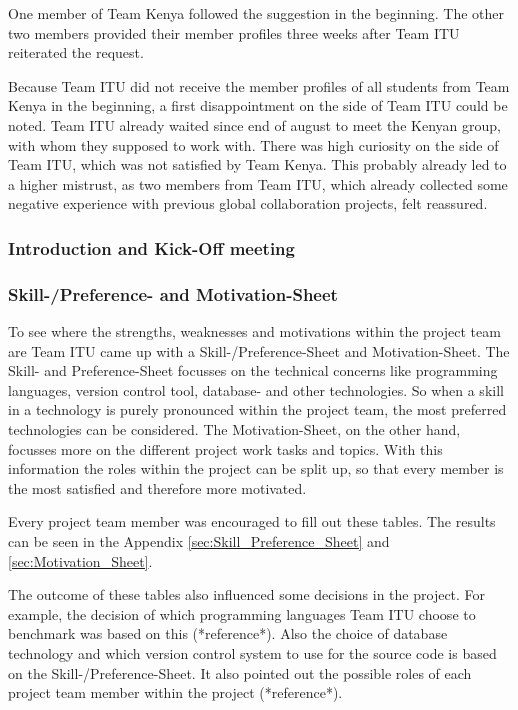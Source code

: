 One member of Team Kenya followed the suggestion in the beginning. The other two members provided their member profiles three weeks after Team ITU reiterated the request.

Because Team ITU did not receive the member profiles of all students from Team Kenya in the beginning, a first disappointment on the side of Team ITU could be noted. Team ITU already waited since end of august to meet the Kenyan group, with whom they supposed to work with. There was high curiosity on the side of Team ITU, which was not satisfied by Team Kenya. This probably already led to a higher mistrust, as two members from Team ITU, which already collected some negative experience with previous global collaboration projects, felt reassured.

\subsubsection {Introduction and Kick-Off meeting}

\subsubsection {Skill-/Preference- and Motivation-Sheet}
To see where the strengths, weaknesses and motivations within the project team are Team ITU came up with a Skill-/Preference-Sheet and Motivation-Sheet. The Skill- and Preference-Sheet focusses on the technical concerns like programming languages, version control tool, database- and other technologies. So when a skill in a technology is purely pronounced within the project team, the most preferred technologies can be considered. The Motivation-Sheet, on the other hand, focusses more on the different project work tasks and topics. With this information the roles within the project can be split up, so that every member is the most satisfied and therefore more motivated.

Every project team member was encouraged to fill out these tables. The results can be seen in the Appendix \ref{sec:Skill_Preference_Sheet} and \ref{sec:Motivation_Sheet}.

The outcome of these tables also influenced some decisions in the project. For example, the decision of which programming languages Team ITU choose to benchmark was based on this (*reference*). Also the choice of database technology and which version control system to use for the source code is based on the Skill-/Preference-Sheet. It also pointed out the possible roles of each project team member within the project (*reference*).

